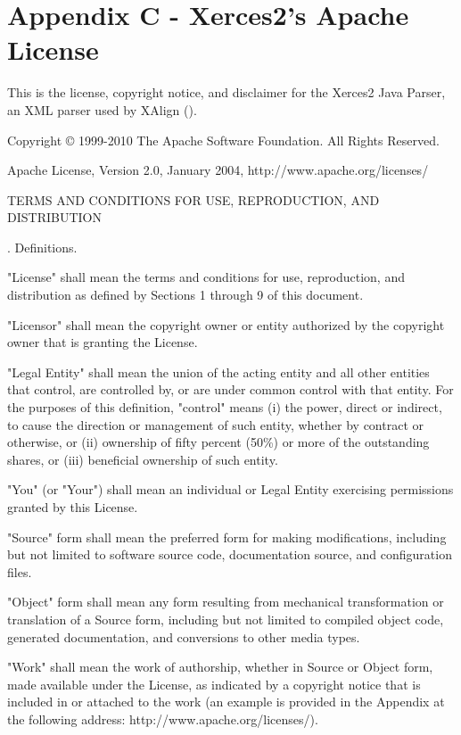 \chapter*{Appendix C - Xerces2's Apache License}
\noindent This is the license, copyright notice, and disclaimer for the Xerces2 Java Parser,
an XML parser used by XAlign (\cite{XAlign}).

\bigskip
\noindent Copyright © 1999-2010 The Apache Software Foundation. All Rights Reserved. 

\bigskip
\noindent Apache License, Version 2.0, January 2004, http://www.apache.org/licenses/

\bigskip
\noindent TERMS AND CONDITIONS FOR USE, REPRODUCTION, AND DISTRIBUTION

\bigskip
{}. Definitions.

\noindent "License" shall mean the terms and conditions for use, reproduction, and distribution as defined by Sections 1 through 9 of this document.

\noindent "Licensor" shall mean the copyright owner or entity authorized by the copyright owner that is granting the License.

\noindent "Legal Entity" shall mean the union of the acting entity and all other entities that control, are controlled by, or are under common control with that entity. For the purposes of this definition, "control" means (i) the power, direct or indirect, to cause the direction or management of such entity, whether by contract or otherwise, or (ii) ownership of fifty percent (50\%) or more of the outstanding shares, or (iii) beneficial ownership of such entity.

\noindent "You" (or "Your") shall mean an individual or Legal Entity exercising permissions granted by this License.

\noindent "Source" form shall mean the preferred form for making modifications, including but not limited to software source code, documentation source, and configuration files.

\noindent "Object" form shall mean any form resulting from mechanical transformation or translation of a Source form, including but not limited to compiled object code, generated documentation, and conversions to other media types.

\noindent "Work" shall mean the work of authorship, whether in Source or Object form, made available under the License, as indicated by a copyright notice that is included in or attached to the work (an example is provided in the Appendix at the following address: http://www.apache.org/licenses/).

